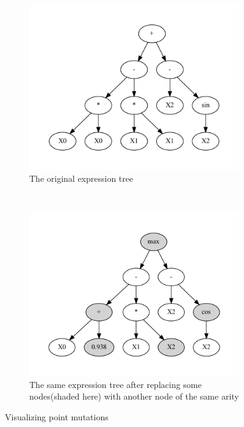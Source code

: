 \begin{figure}[htp]
  \centering
  \begin{subfigure}{\textwidth}
    \centering
    \includegraphics[scale=0.8]{images/graphviz/point_mut_before.dot.pdf}
    \caption{The original expression tree}
    \label{fig:point_muta}
  \end{subfigure}%
  \\
  \begin{subfigure}{\textwidth}
    \centering
    \includegraphics[scale=0.8]{images/graphviz/point_mut_after.dot.pdf}
    \caption{The same expression tree after replacing some nodes(shaded here) with another node of the same arity}
    \label{fig:point_mutb}
  \end{subfigure}
  \caption{Visualizing point mutations}
  
  \label{fig:point_mut}
\end{figure}


